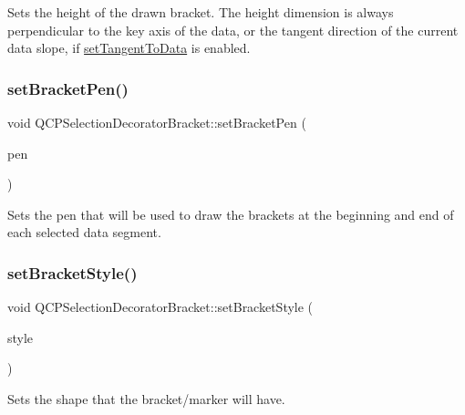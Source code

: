 Sets the height of the drawn bracket. The height dimension is always perpendicular to the key axis of the data, or the tangent direction of the current data slope, if \mbox{\hyperlink{class_q_c_p_selection_decorator_bracket_a93bc6086e53a5e40a08641a7b2e2cdd5}{set\+Tangent\+To\+Data}} is enabled. \mbox{\label{class_q_c_p_selection_decorator_bracket_ac0e392a6097990f8aa978932a8fa05d6}} 
\subsubsection{\texorpdfstring{set\+Bracket\+Pen()}{setBracketPen()}}
{\footnotesize\ttfamily void Q\+C\+P\+Selection\+Decorator\+Bracket\+::set\+Bracket\+Pen (\begin{DoxyParamCaption}\item[{const Q\+Pen \&}]{pen }\end{DoxyParamCaption})}

Sets the pen that will be used to draw the brackets at the beginning and end of each selected data segment. \mbox{\label{class_q_c_p_selection_decorator_bracket_a04507697438f6ad8cc2aeea5422dcbe5}} 
\subsubsection{\texorpdfstring{set\+Bracket\+Style()}{setBracketStyle()}}
{\footnotesize\ttfamily void Q\+C\+P\+Selection\+Decorator\+Bracket\+::set\+Bracket\+Style (\begin{DoxyParamCaption}\item[{\mbox{\hyperlink{class_q_c_p_selection_decorator_bracket_aa6d18517ec0553575bbef0de4252336e}{Q\+C\+P\+Selection\+Decorator\+Bracket\+::\+Bracket\+Style}}}]{style }\end{DoxyParamCaption})}

Sets the shape that the bracket/marker will have.

